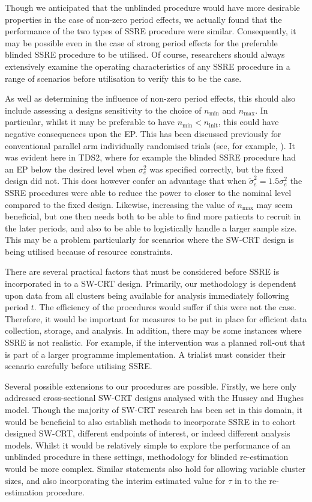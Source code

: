 \documentclass{article}
\begin{document}
Though we anticipated that the unblinded procedure would have more desirable properties in the case of non-zero period effects, we actually found that the performance of the two types of SSRE procedure were similar. Consequently, it may be possible even in the case of strong period effects for the preferable blinded SSRE procedure to be utilised. Of course, researchers should always extensively examine the operating characteristics of any SSRE procedure in a range of scenarios before utilisation to verify this to be the case.

As well as determining the influence of non-zero period effects, this should also include assessing a designs sensitivity to the choice of $n_\text{min}$ and $n_\text{max}$. In particular, whilst it may be preferable to have $n_\text{min}<n_\text{init}$, this could have negative consequences upon the EP. This has been discussed previously for conventional parallel arm individually randomised trials (see, for example, \citet{bowden2014}). It was evident here in TDS2, where for example the blinded SSRE procedure had an EP below the desired level when $\sigma_e^2$ was specified correctly, but the fixed design did not. This does however confer an advantage that when $\tilde{\sigma}_e^2=1.5\sigma_e^2$ the SSRE procedures were able to reduce the power to closer to the nominal level compared to the fixed design. Likewise, increasing the value of $n_\text{max}$ may seem beneficial, but one then needs both to be able to find more patients to recruit in the later periods, and also to be able to logistically handle a larger sample size. This may be a problem particularly for scenarios where the SW-CRT design is being utilised because of resource constraints.

There are several practical factors that must be considered before SSRE is incorporated in to a SW-CRT design. Primarily, our methodology is dependent upon data from all clusters being available for analysis immediately following period $t$. The efficiency of the procedures would suffer if this were not the case. Therefore, it would be important for measures to be put in place for efficient data collection, storage, and analysis. In addition, there may be some instances where SSRE is not realistic. For example, if the intervention was a planned roll-out that is part of a larger programme implementation. A trialist must consider their scenario carefully before utilising SSRE.

Several possible extensions to our procedures are possible. Firstly, we here only addressed cross-sectional SW-CRT designs analysed with the Hussey and Hughes model. Though the majority of SW-CRT research has been set in this domain, it would be beneficial to also establish methods to incorporate SSRE in to cohort designed SW-CRT, different endpoints of interest, or indeed different analysis models. Whilst it would be relatively simple to explore the performance of an unblinded procedure in these settings, methodology for blinded re-estimation would be more complex. Similar statements also hold for allowing variable cluster sizes, and also incorporating the interim estimated value for $\tau$ in to the re-estimation procedure.
\end{document}
